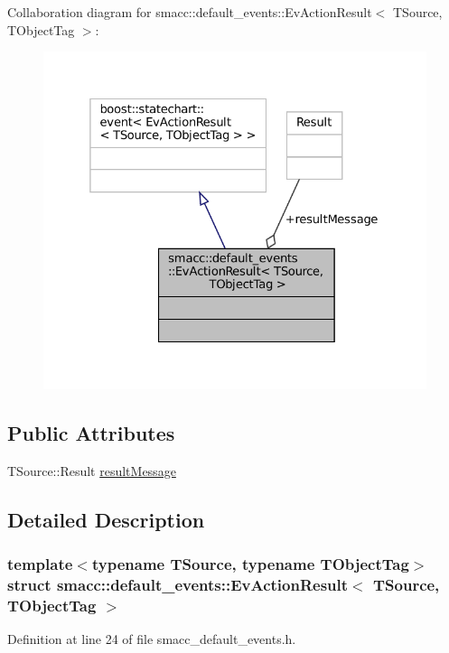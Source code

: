 Collaboration diagram for smacc\+:\+:default\+\_\+events\+:\+:Ev\+Action\+Result$<$ T\+Source, T\+Object\+Tag $>$\+:
\nopagebreak
\begin{figure}[H]
\begin{center}
\leavevmode
\includegraphics[width=325pt]{structsmacc_1_1default__events_1_1EvActionResult__coll__graph}
\end{center}
\end{figure}
\subsection*{Public Attributes}
\begin{DoxyCompactItemize}
\item 
T\+Source\+::\+Result \hyperlink{structsmacc_1_1default__events_1_1EvActionResult_a446603e4d43ded6c16a7abba1bf8bfcd}{result\+Message}
\end{DoxyCompactItemize}


\subsection{Detailed Description}
\subsubsection*{template$<$typename T\+Source, typename T\+Object\+Tag$>$\newline
struct smacc\+::default\+\_\+events\+::\+Ev\+Action\+Result$<$ T\+Source, T\+Object\+Tag $>$}



Definition at line 24 of file smacc\+\_\+default\+\_\+events.\+h.



